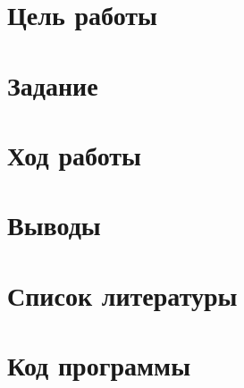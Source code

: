 


	
	\tableofcontents
	\newpage
	\section*{Цель работы}
	
	\section*{Задание}
	
	\newpage
	\section*{Ход работы}
	
	\newpage
	\section*{Выводы}
	
	\newpage
	\section*{Список литературы}
	
	\newpage
	\section*{Код программы}
	

